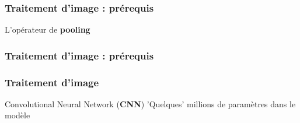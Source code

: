 \documentclass{formation}
\begin{document}
\begin{frame}
  \frametitle{Traitement d'image : prérequis}
  L'opérateur de \textbf{pooling}
\end{frame}

\begin{frame}
  \frametitle{Traitement d'image : prérequis}
\end{frame}

\begin{frame}
  \frametitle{Traitement d'image}
  Convolutional Neural Network (\textbf{CNN})
  'Quelques' millions de paramètres dans le modèle
\end{frame}
\end{document}
